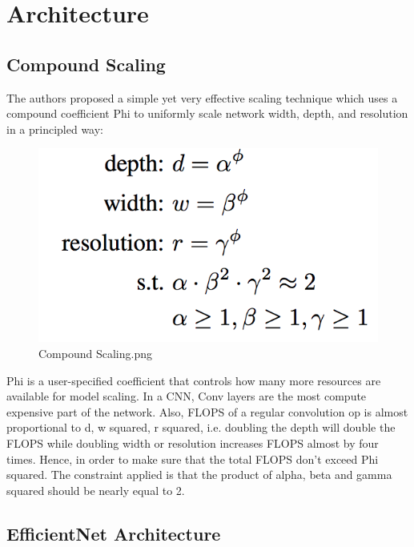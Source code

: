 \chapter{Architecture}
\section{Compound Scaling}

The authors proposed a simple yet very effective scaling technique which uses a compound coefficient Phi to uniformly scale network width, depth, and resolution in a principled way:
\begin{figure}[htpb]
\centering
\includegraphics[width=\textwidth,height=\textheight,keepaspectratio]{../../static/Compound Scaling.png}
\caption{Compound Scaling.png}
\end{figure}Phi is a user-specified coefficient that controls how many more resources are available for model scaling. In a CNN, Conv layers are the most compute expensive part of the network. Also, FLOPS of a regular convolution op is almost proportional to d, w squared, r squared, i.e. doubling the depth will double the FLOPS while doubling width or resolution increases FLOPS almost by four times. Hence, in order to make sure that the total FLOPS don’t exceed Phi squared. The constraint applied is that the product of alpha, beta and gamma squared should be nearly equal to 2.
\section{EfficientNet Architecture}

